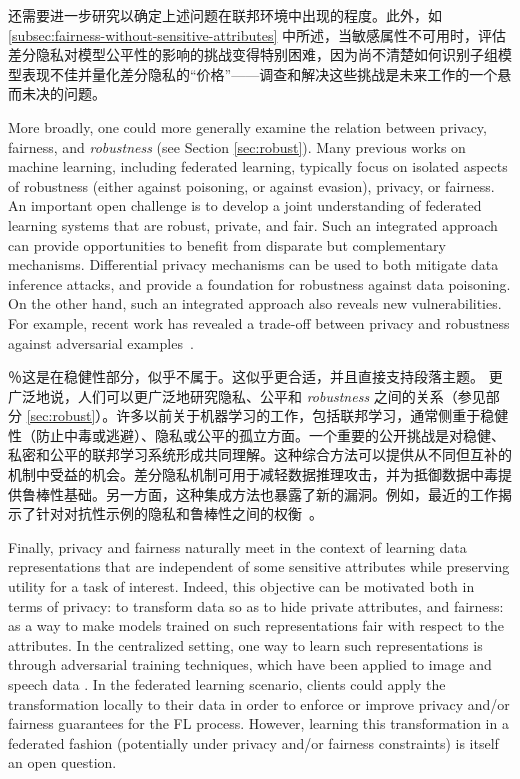 还需要进一步研究以确定上述问题在联邦环境中出现的程度。此外，如 \cref{subsec:fairness-without-sensitive-attributes} 中所述，当敏感属性不可用时，评估差分隐私对模型公平性的影响的挑战变得特别困难，因为尚不清楚如何识别子组模型表现不佳并量化差分隐私的“价格”——调查和解决这些挑战是未来工作的一个悬而未决的问题。


More broadly, one could more generally examine the relation between privacy, fairness, and \emph{robustness} (see Section \ref{sec:robust}). Many previous works on machine learning, including federated learning, typically focus on isolated aspects of robustness (either against poisoning, or against evasion), privacy, or fairness. An important open challenge is to develop a joint understanding of federated learning systems that are robust, private, and fair. Such an integrated approach can provide opportunities to benefit from disparate but complementary mechanisms. Differential privacy mechanisms can be used to both mitigate data inference attacks, and provide a foundation for robustness against data poisoning. On the other hand, such an integrated approach also reveals new vulnerabilities. For example, recent work has revealed a trade-off between privacy and robustness against adversarial examples~\cite{song:ccs19}.

％这是在稳健性部分，似乎不属于。这似乎更合适，并且直接支持段落主题。
更广泛地说，人们可以更广泛地研究隐私、公平和 \emph{robustness} 之间的关系（参见部分 \ref{sec:robust}）。许多以前关于机器学习的工作，包括联邦学习，通常侧重于稳健性（防止中毒或逃避）、隐私或公平的孤立方面。一个重要的公开挑战是对稳健、私密和公平的联邦学习系统形成共同理解。这种综合方法可以提供从不同但互补的机制中受益的机会。差分隐私机制可用于减轻数据推理攻击，并为抵御数据中毒提供鲁棒性基础。另一方面，这种集成方法也暴露了新的漏洞。例如，最近的工作揭示了针对对抗性示例的隐私和鲁棒性之间的权衡~\cite{song:ccs19}。


Finally, privacy and fairness naturally meet in the context of learning data representations that are independent of some sensitive attributes while preserving utility for a task of interest. Indeed, this objective can be motivated both in terms of privacy: to transform data so as to hide private attributes, and fairness: as a way to make models trained on such representations fair with respect to the attributes. In the centralized setting, one way to learn such representations is through adversarial training techniques, which have been applied to image and speech data \citep{kairouz20learning,DBLP:journals/corr/abs-1802-09386,Madras2018,Bertran2019,Srivastava2019a}. In the federated learning scenario, clients could apply the transformation locally to their data in order to enforce or improve privacy and/or fairness guarantees for the FL process. However, learning this transformation in a federated fashion (potentially under privacy and/or fairness constraints) is itself an open question.

